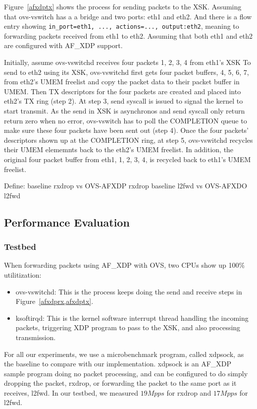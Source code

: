 \documentclass[10pt]{sigplanconf}
\begin{document}
Figure~\ref{afxdptx} shows the process for sending packets to the XSK.
Assuming that ovs-vswitch has a a bridge and two ports: eth1 and eth2.
And there is a flow entry showing
\texttt{in\_port=eth1, ..., actions=..., output:eth2}, meaning to forwarding
packets received from eth1 to eth2.
Assuming that both eth1 and eth2 are configured with AF\_XDP support.

Initially, assume ovs-vswitchd receives four packets {1, 2, 3, 4} from eth1's XSK
To send to eth2 using its XSK, ovs-vswitchd first gets four packet buffers,
{4, 5, 6, 7}, from eth2's UMEM freelist and copy the packet data to their
packet buffer in UMEM.  Then TX descriptors for the four packets are
created and placed into eth2's TX ring (step 2).
At step 3, send syscall is issued to signal the kernel to start transmit.
As the send in XSK is asynchronos and send syscall only return return zero when
no error, ovs-vswitch has to poll the COMPLETION queue to make sure these four
packets have been sent out (step 4).
Once the four packets' descriptors shown up at the COMPLETION ring, at step 5,
ovs-vswitchd recycles their UMEM elememnts back to the eth2's UMEM freelist.
In addition, the original four packet buffer from eth1, {1, 2, 3, 4}, is
recycled back to eth1's UMEM freelist.


Define:
baseline rxdrop vs OVS-AFXDP rxdrop
baseline l2fwd vs OVS-AFXDO l2fwd
\subsection{Performance Evaluation}

\subsubsection{Testbed}

When forwarding packets using AF\_XDP with OVS, two CPUs show up
100\% utilitization:
\begin{itemize}
\item ovs-vswitchd: This is the process keeps doing the send and receive steps
in Figure~\ref{afxdprx,afxdptx}.
\item ksoftirqd: This is the kernel software interrupt thread handling the
incoming packets, triggering XDP program to pass to the XSK, and also processing
transmission.
\end{itemize}

For all our experiments, we use a microbenchmark program, called xdpsock,
as the baseline to compare with our implementation.
xdpsock is an AF\_XDP sample program doing no packet processing, and can be configured
to do simply dropping the packet, rxdrop, or forwarding the packet to the same port as
it receives, l2fwd.  In our testbed, we measured $19Mpps$ for rxdrop and $17Mpps$ for
l2fwd.
\end{document}
